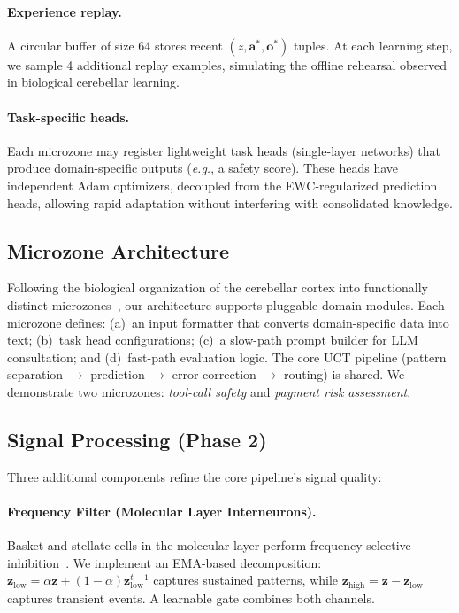 \documentclass[11pt,a4paper]{article}
\newcommand{\eg}{\textit{e.g.}}
\begin{document}
\paragraph{Experience replay.}
A circular buffer of size 64 stores recent $(z, \mathbf{a}^*, \mathbf{o}^*)$ tuples.
At each learning step, we sample 4 additional replay examples, simulating the offline rehearsal observed in biological cerebellar learning.

\paragraph{Task-specific heads.}
Each microzone may register lightweight task heads (single-layer networks) that produce domain-specific outputs (\eg{}, a safety score).
These heads have independent Adam optimizers, decoupled from the EWC-regularized prediction heads, allowing rapid adaptation without interfering with consolidated knowledge.

\subsection{Microzone Architecture}\label{sec:microzones}

Following the biological organization of the cerebellar cortex into functionally distinct microzones~\citep{apps2005anatomical}, our architecture supports pluggable domain modules.
Each microzone defines:
(a)~an input formatter that converts domain-specific data into text;
(b)~task head configurations;
(c)~a slow-path prompt builder for LLM consultation; and
(d)~fast-path evaluation logic.
The core UCT pipeline (pattern separation $\to$ prediction $\to$ error correction $\to$ routing) is shared.
We demonstrate two microzones: \emph{tool-call safety} and \emph{payment risk assessment}.

\subsection{Signal Processing (Phase 2)}\label{sec:phase2}

Three additional components refine the core pipeline's signal quality:

\paragraph{Frequency Filter (Molecular Layer Interneurons).}
Basket and stellate cells in the molecular layer perform frequency-selective inhibition~\citep{rieubland2014interneurons}.
We implement an EMA-based decomposition: $\mathbf{z}_{\text{low}} = \alpha \mathbf{z} + (1-\alpha)\mathbf{z}_{\text{low}}^{t-1}$ captures sustained patterns, while $\mathbf{z}_{\text{high}} = \mathbf{z} - \mathbf{z}_{\text{low}}$ captures transient events.
A learnable gate combines both channels.
\end{document}
